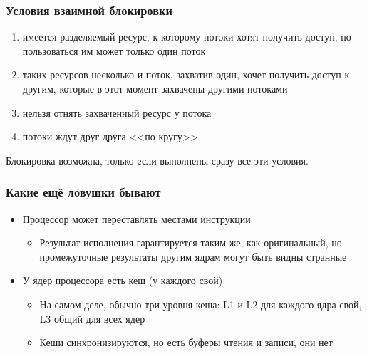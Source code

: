 \documentclass[xetex,mathserif,serif]{beamer}
\begin{document}
    \begin{frame}
        \frametitle{Условия взаимной блокировки}
        \begin{enumerate}
            \item имеется разделяемый ресурс, к которому потоки хотят получить доступ, но пользоваться им может только один поток
            \item таких ресурсов несколько и поток, захватив один, хочет получить доступ к другим, которые в этот момент захвачены другими потоками
            \item нельзя отнять захваченный ресурс у потока
            \item потоки ждут друг друга <<по кругу>>
        \end{enumerate}
        Блокировка возможна, только если выполнены сразу все эти условия.
    \end{frame}

    \begin{frame}
        \frametitle{Какие ещё ловушки бывают}
        \begin{itemize}
            \item Процессор может переставлять местами инструкции
            \begin{itemize}
                \item Результат исполнения гарантируется таким же, как оригинальный, но промежуточные результаты другим 
                    ядрам могут быть видны странные
            \end{itemize}
            \item У ядер процессора есть кеш (у каждого свой)
            \begin{itemize}
                \item На самом деле, обычно три уровня кеша: L1 и L2 для каждого ядра свой, L3 общий для всех ядер
                \item Кеши синхронизируются, но есть буферы чтения и записи, они нет
            \end{itemize}
        \end{itemize}
    \end{frame}
\end{document}
